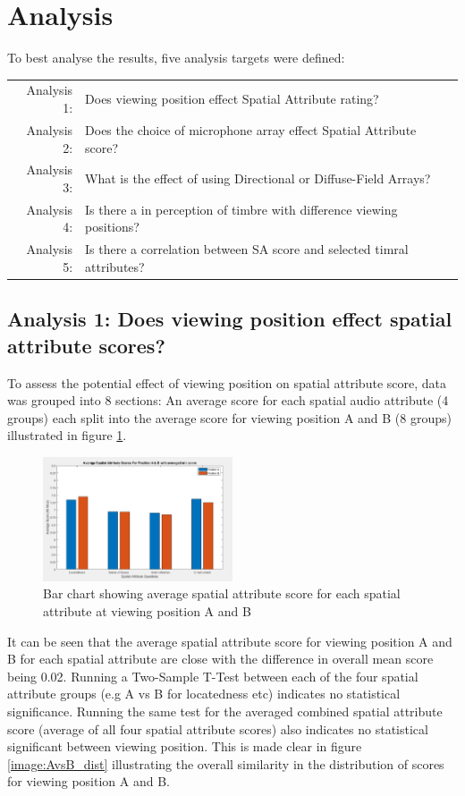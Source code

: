 
\section{Analysis}
	To best analyse the results, five analysis targets were defined:

	\begin{tabular}{r p{5.5cm}}
		Analysis 1: & Does viewing position effect Spatial Attribute rating? \\
		Analysis 2: & Does the choice of microphone array effect Spatial Attribute score? \\
		Analysis 3: & What is the effect of using Directional or Diffuse-Field Arrays? \\ 
		Analysis 4: & Is there a in perception of timbre with difference viewing positions? \\
		Analysis 5: & Is there a correlation between SA score and selected timral attributes?
	\end{tabular}

	\subsection{Analysis 1: Does viewing position effect spatial attribute scores?}
	\label{ana1}

		To assess the potential effect of viewing position on spatial attribute score, data was grouped into 8 sections: An average score for each spatial audio attribute (4 groups) each split into the average score for viewing position A and B (8 groups) illustrated in figure \ref{image:AvsB}. \\

		\begin{figure}
			\includegraphics[width=0.5\textwidth]{images/plots/AvB_Bar.PNG}
			\caption{Bar chart showing average spatial attribute score for each spatial attribute at viewing position A and B}
			\label{image:AvsB} 
		\end{figure}

		It can be seen that the average spatial attribute score for viewing position A and B for each spatial attribute are close with the difference in overall mean score being 0.02. Running a Two-Sample T-Test between each of the four spatial attribute groups (e.g A vs B for locatedness etc) indicates no statistical significance. Running the same test for the averaged combined spatial attribute score (average of all four spatial attribute scores) also indicates no statistical significant between viewing position. This is made clear in figure \ref{image:AvsB_dist} illustrating the overall similarity in the distribution of scores for viewing position A and B. \\
		
